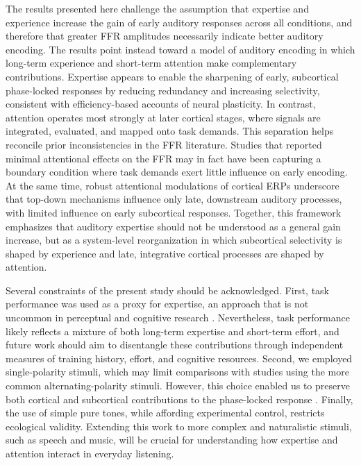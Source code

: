 \documentclass{article}
\begin{document}
The results presented here challenge the assumption that expertise and experience increase the gain of early auditory responses across all conditions, and therefore that greater FFR amplitudes necessarily indicate better auditory encoding. The results point instead toward a model of auditory encoding in which long-term experience and short-term attention make complementary contributions. Expertise appears to enable the sharpening of early, subcortical phase-locked responses by reducing redundancy and increasing selectivity, consistent with efficiency-based accounts of neural plasticity. In contrast, attention operates most strongly at later cortical stages, where signals are integrated, evaluated, and mapped onto task demands. This separation helps reconcile prior inconsistencies in the FFR literature. Studies that reported minimal attentional effects on the FFR may in fact have been capturing a boundary condition where task demands exert little influence on early encoding. At the same time, robust attentional modulations of cortical ERPs underscore that top-down mechanisms influence only late, downstream auditory processes, with limited influence on early subcortical responses. Together, this framework emphasizes that auditory expertise should not be understood as a general gain increase, but as a system-level reorganization in which subcortical selectivity is shaped by experience and late, integrative cortical processes are shaped by attention.

Several constraints of the present study should be acknowledged. First, task performance was used as a proxy for expertise, an approach that is not uncommon in perceptual and cognitive research \parencite[e.g., ][]{Luthra_2024, Gauthier_1998}. Nevertheless, task performance likely reflects a mixture of both long-term expertise and short-term effort, and future work should aim to disentangle these contributions through independent measures of training history, effort, and cognitive resources. Second, we employed single-polarity stimuli, which may limit comparisons with studies using the more common alternating-polarity stimuli. However, this choice enabled us to preserve both cortical and subcortical contributions to the phase-locked response \parencite{Tichko_2017, Bidelman_2015b}. Finally, the use of simple pure tones, while affording experimental control, restricts ecological validity. Extending this work to more complex and naturalistic stimuli, such as speech and music, will be crucial for understanding how expertise and attention interact in everyday listening.
\end{document}
